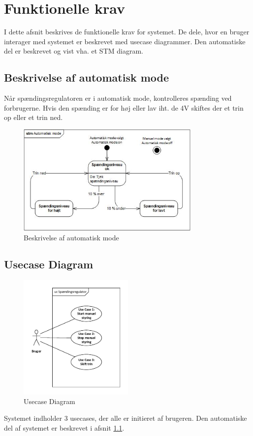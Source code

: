 
\section{Funktionelle krav}
I dette afsnit beskrives de funktionelle krav for systemet. De dele, hvor en bruger interager med systemet er beskrevet med usecase diagrammer. Den automatiske del er beskrevet og vist vha. et STM diagram.

\subsection{Beskrivelse af automatisk mode}
\label{Afsnit: Automatisk mode}

Når spændingsregulatoren er i automatisk mode, kontrolleres spænding ved forbrugerne. Hvis den spænding er for høj eller lav iht. de 4V skiftes der et trin op eller et trin ned.  
\begin{figure}[htbp] %
	\centering
	\includegraphics[width=0.8\textwidth]{Figure/STM}
	\caption{Beskrivelse af automatisk mode}
	\label{fig:automode}
\end{figure}

\subsection{Usecase Diagram}

\begin{figure}[htbp] %
	\centering
	\includegraphics[width=0.5\textwidth]{Figure/UsecaseDiagram}
	\caption{Usecase Diagram}
	\label{fig:UsecaseDiagram}
\end{figure}
Systemet indholder 3 usecases, der alle er initieret af brugeren. Den automatiske del af systemet er beskrevet i afsnit \ref{Afsnit: Automatisk mode}.

